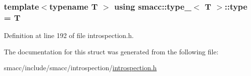 \subsubsection[{\texorpdfstring{type}{type}}]{\setlength{\rightskip}{0pt plus 5cm}template$<$typename T $>$ using {\bf smacc\+::type\+\_\+}$<$ T $>$\+::{\bf type} =  T}\hypertarget{structsmacc_1_1type___a9b8fcdd94d0e9fc71366e867a4094463}{}\label{structsmacc_1_1type___a9b8fcdd94d0e9fc71366e867a4094463}


Definition at line 192 of file introspection.\+h.



The documentation for this struct was generated from the following file\+:\begin{DoxyCompactItemize}
\item 
smacc/include/smacc/introspection/\hyperlink{introspection_8h}{introspection.\+h}\end{DoxyCompactItemize}

